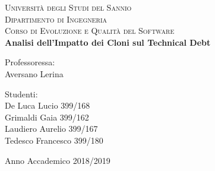 


\begin{titlepage}
\begin{adjustwidth}{-5em}{}
 \begin{center}
	\vspace{4em}
      {\Large \textsc{Università degli Studi del Sannio}}\\
      \vspace{1em}
      {\Large \textsc{Dipartimento di Ingegneria}}\\
      \vspace{1em}
      {\large \textsc{Corso di Evoluzione e Qualità del Software}}\\
      \vspace{5em}
      {\normalsize \textbf{Analisi dell'Impatto dei Cloni sul Technical Debt}\\
      	\vspace{1em}
      }%
    \end{center}

\vskip 2.5cm
\begin{center}
	\begin{minipage}[t]{0.5\textwidth}
		\begin{flushleft}
			\large Professoressa:\vspace*{0.2cm} \\
			Aversano Lerina
		\end{flushleft}
	\end{minipage}%
	\begin{minipage}[t]{0.5\textwidth}
		\begin{flushright}
			\large Studenti:\vspace*{0.2cm} \\
			De Luca Lucio 399/168\\
			Grimaldi Gaia 399/162\\
			Laudiero Aurelio 399/167\\
			Tedesco Francesco 399/180\\
		\end{flushright}
	\end{minipage}
\end{center}
\end{adjustwidth}


\vspace*{1.5cm}
\begin{center}
\begin{minipage}[t]{0.5\textwidth}
	{\normalsize Anno Accademico 2018/2019}
\end{minipage}
\end{center}
\end{titlepage}
